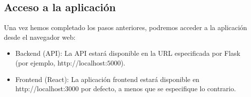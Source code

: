 \subsection{Acceso a la aplicación}
Una vez hemos completado los pasos anteriores, podremos acceder a la aplicación desde el navegador web:
\begin{itemize}
	\item Backend (API): La API estará disponible en la URL especificada por Flask (por ejemplo, http://localhost:$5000$).
	\item Frontend (React): La aplicación frontend estará disponible en http://localhost:$3000$ por defecto, a menos que se especifique lo contrario.
\end{itemize}

\endinput
